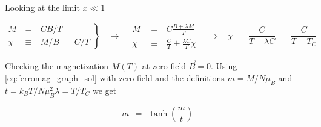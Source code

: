 \documentclass[10pt]{report}
\numberwithin{equation}{chapter}
\begin{document}
Looking at the limit $ x \ll 1$ 

\begin{equation*}
  \left.
  \begin{array}{lcr}
    M ~ & = &~ C B/T \\
    \chi ~ & \equiv &~ M/B ~=~ C/T
  \end{array} \right\} 
  ~~~~ \rightarrow ~~~~ 
  \begin{array}{lcr}
    M ~~&=& ~ C \frac{B + \lambda M}{T}\\
    \chi ~ &\equiv& ~ \frac{C}{T} + \frac{\lambda C}{T} \chi
  \end{array}
  ~~~~ \Rightarrow ~~~~ 
  \chi ~=~ \frac{C}{T-\lambda C} ~=~ \frac{C}{T - T_C}
\end{equation*}


Checking the magnetization $M(T)$ at zero field $\vec{B} = 0$. Using \ref{eq:ferromag_graph_sol} with zero field and the definitions $m = M/N \mu_B$ and $t = k_BT/N \mu_B^2 \lambda = T/T_C$ we get

\begin{equation}
  m ~~=~~ \tanh(\frac{m}{t})
\end{equation}
\end{document}
